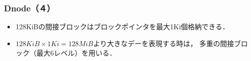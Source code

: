 \documentclass{beamer}                   %
\begin{document}
\begin{frame}[fragile]
  \frametitle{Dnode（４）}
  \begin{itemize}
  \item 128KiBの間接ブロックはブロックポインタを最大1Ki個格納できる．
  \item $128KiB \times 1Ki = 128MiB$より大きなデーを表現する時は，
    多重の間接ブロック（最大6レベル）を用いる．
  \end{itemize}
  \vfill
\end{frame}

\end{document}
